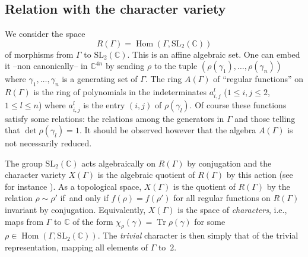 \documentclass[11pt]{article}
\newcommand{\ie}{i.e.,\xspace}
\theoremstyle{definition}
\newcommand{\CC}{\mathbb{C}}
\newcommand{\tr}{\operatorname{Tr}}
\newcommand{\SL}{\mathrm{SL}}
\newcommand{\Hom}{\operatorname{Hom}}
\begin{document}
\subsection{Relation with the character variety}\label{introcarac}

We consider the space
\[ R(\Gamma) = \Hom(\Gamma,\SL_2(\CC)) \]
of morphisms from $\Gamma$ to $\SL_2(\CC)$. This is an affine algebraic set.
One can embed it --non canonically-- in $\CC^{4n}$ by sending $\rho$ to the
tuple $(\rho(\gamma_1),\ldots,\rho(\gamma_n))$ where
$\gamma_1,\ldots,\gamma_n$ is a generating set of $\Gamma$.
The ring $A(\Gamma)$ of ``regular functions'' on $R(\Gamma)$ is the ring of
polynomials in the indeterminates $a_{i,j}^l$
($1\leq i,j\leq 2$, $1\leq l\leq n$)
where $a_{i,j}^l$ is the entry $(i,j)$ of $\rho(\gamma_l)$. Of course
these functions satisfy some relations: the relations among the generators
in $\Gamma$ and those telling that $\det \rho(\gamma_l)=1$.
It should be observed however that
the algebra $A(\Gamma)$ is not necessarily reduced.

The group $\SL_2(\CC)$ acts algebraically on $R(\Gamma)$ by conjugation and
the character variety $X(\Gamma)$ is the algebraic quotient of $R(\Gamma)$ by
this action (see for instance \cite[\S5.1]{Mukai}).
As a topological space, $X(\Gamma)$ is the quotient of
$R(\Gamma)$ by the relation $\rho\sim\rho'$ if~and only if
$f(\rho)=f(\rho')$ for all regular functions on $R(\Gamma)$ invariant
by conjugation.
Equivalently, $X(\Gamma)$ is the space of
{\em characters}, \ie 
maps from $\Gamma$ to $\CC$ of the form $\chi_\rho(\gamma)=\tr \rho(\gamma)$
for some $\rho\in \Hom(\Gamma,\SL_2(\CC))$.
The {\em trivial} character is then simply that of the trivial representation,
mapping all elements of $\Gamma$ to~$2$.
\end{document}
